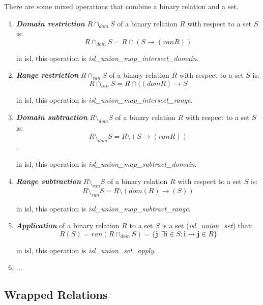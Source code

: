 There are some mixed operations that combine a binary relation and a set.

\begin{enumerate}
  \item \textcolor{vr}{\textbf{\emph{Domain restriction}} $R \cap_{dom} S$ of a binary relation $R$ with respect to a set $S$} is:
  $$R\cap_{dom} S = R \cap (S \rightarrow (ran R))$$

  in isl, this operation is \textcolor{pg}{\emph{isl\_union\_map\_intersect\_domain}}.

  \item \textcolor{vr}{\textbf{\emph{Range restriction}} $R \cap_{ran} S$ of a binary relation $R$ with respect to a set $S$} is:
  $$R\cap_{ran} S = R \cap ((dom R) \rightarrow S $$

  in isl, this operation is \textcolor{pg}{\emph{isl\_union\_map\_intersect\_range}}.

  \item \textcolor{vr}{\textbf{\emph{Domain subtraction}} $R \setminus_{dom} S$ of a binary relation $R$ with respect to a set $S$} is:
  $$ R\setminus_{dom} S = R \setminus (S \rightarrow (ran R)) $$.

  in isl, this operation is \textcolor{pg}{\emph{isl\_union\_map\_subtract\_domain}}.

  \item \textcolor{vr}{\textbf{\emph{Range subtraction}} $R \setminus_{ran} S$ of a binary relation $R$ with respect to a set $S$} is:
  $$ R\setminus_{ran} S = R \setminus (dom(R) \rightarrow (S)) $$

  in isl, this operation is \textcolor{pg}{\emph{isl\_union\_map\_subtract\_range}}.

  \item \textcolor{vr}{\textbf{\emph{Application}}} of a binary relation $R$ to a set $S$ is a set (\textcolor{pg}{\emph{isl\_union\_set}}) that:
  $$R(S) = ran(R \cap_{dom} S) = \{ \mathbf{j} : \exists \mathbf{i} \in S: \mathbf{i} \rightarrow \mathbf{j} \in R \}$$

  in isl, this operation is \textcolor{pg}{\emph{isl\_union\_set\_apply}}.

  \item ...
\end{enumerate}

\subsection{Wrapped Relations}

